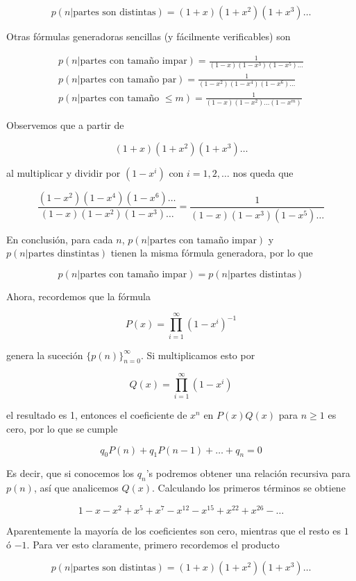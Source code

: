\[
p(n | \text{partes son distintas}) = (1+x)(1+x^2)(1+x^3)\dots
\]

Otras fórmulas generadoras sencillas (y fácilmente verificables) son

\begin{gather*}
    p(n | \text{partes con tamaño impar}) = \frac{1}{(1-x)(1-x^3)(1-x^5)\dots} \\
    p(n | \text{partes con tamaño par}) = \frac{1}{(1-x^2)(1-x^4)(1-x^6)\dots} \\
    p(n | \text{partes con tamaño $\leq m$}) = \frac{1}{(1-x)(1-x^2)\dots(1-x^m)}
\end{gather*}

Observemos que a partir de

\[
(1+x)(1+x^2)(1+x^3)\dots
\]

\noindent al multiplicar y dividir por $(1-x^i)$ con $i = 1, 2, \dots$ nos queda que

\[
\frac{(1-x^2)(1-x^4)(1-x^6) \dots}{(1-x)(1-x^2)(1-x^3) \dots}  = \frac{1}{(1-x)(1-x^3)(1-x^5) \dots}
\]

En conclusión, para cada $n$, $p(n | \text{partes con tamaño impar})$ y $p(n | \text{partes dinstintas})$ tienen la misma fórmula generadora, por lo que

\[
p(n | \text{partes con tamaño impar}) = p(n | \text{partes distintas})
\]

Ahora, recordemos que la fórmula

\[
P(x) = \prod_{i=1}^{\infty}(1-x^i)^{-1}
\]

\noindent genera la suceción $\{p(n)\}_{n=0}^{\infty}$. Si multiplicamos esto por

\[
Q(x) = \prod_{i=1}^{\infty} (1-x^i)
\]

\noindent el resultado es 1, entonces el coeficiente de $x^n$ en $P(x)Q(x)$ para $n \geq 1$ es cero, por lo que se cumple

\[
q_0P(n) + q_1P(n-1) + \dots + q_n = 0
\]

Es decir, que si conocemos los $q_n$'s podremos obtener una relación recursiva para $p(n)$, así que analicemos $Q(x)$. Calculando los primeros términos se obtiene

\[
1 - x - x^2 + x^5 + x^7 - x^{12} - x^{15} + x^{22} + x^{26} - \dots
\]

Aparentemente la mayoría de los coeficientes son cero, mientras que el resto es $1$ ó $-1$. Para ver esto claramente, primero recordemos el producto

\[
p(n | \text{partes son distintas}) = (1+x)(1+x^2)(1+x^3)\dots
\]

